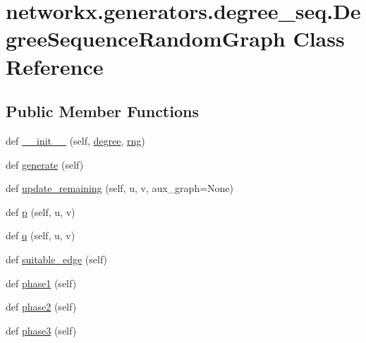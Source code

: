 \hypertarget{classnetworkx_1_1generators_1_1degree__seq_1_1DegreeSequenceRandomGraph}{}\section{networkx.\+generators.\+degree\+\_\+seq.\+Degree\+Sequence\+Random\+Graph Class Reference}
\label{classnetworkx_1_1generators_1_1degree__seq_1_1DegreeSequenceRandomGraph}
\subsection*{Public Member Functions}
\begin{DoxyCompactItemize}
\item 
def \hyperlink{classnetworkx_1_1generators_1_1degree__seq_1_1DegreeSequenceRandomGraph_abda1215d49ed03bca8b727bfaa3da4e8}{\+\_\+\+\_\+init\+\_\+\+\_\+} (self, \hyperlink{classnetworkx_1_1generators_1_1degree__seq_1_1DegreeSequenceRandomGraph_a96bccf4dd0c73fdd2569d20f7770212b}{degree}, \hyperlink{classnetworkx_1_1generators_1_1degree__seq_1_1DegreeSequenceRandomGraph_a454449cec97996eccfa28577c5055d76}{rng})
\item 
def \hyperlink{classnetworkx_1_1generators_1_1degree__seq_1_1DegreeSequenceRandomGraph_aa9e966221ec4f5b18670f6d5bac04b36}{generate} (self)
\item 
def \hyperlink{classnetworkx_1_1generators_1_1degree__seq_1_1DegreeSequenceRandomGraph_aa935b51d6d91c0256b943c147f18e32a}{update\+\_\+remaining} (self, u, v, aux\+\_\+graph=None)
\item 
def \hyperlink{classnetworkx_1_1generators_1_1degree__seq_1_1DegreeSequenceRandomGraph_aecacf66c53d371d3080cd12f33090098}{p} (self, u, v)
\item 
def \hyperlink{classnetworkx_1_1generators_1_1degree__seq_1_1DegreeSequenceRandomGraph_a1b64a2858c0e3a6ff01d9942db65ec83}{q} (self, u, v)
\item 
def \hyperlink{classnetworkx_1_1generators_1_1degree__seq_1_1DegreeSequenceRandomGraph_ab58872d19209a86d7ba8db198d1e7dbe}{suitable\+\_\+edge} (self)
\item 
def \hyperlink{classnetworkx_1_1generators_1_1degree__seq_1_1DegreeSequenceRandomGraph_a2f7fdd19d24b8367bc62414833be0412}{phase1} (self)
\item 
def \hyperlink{classnetworkx_1_1generators_1_1degree__seq_1_1DegreeSequenceRandomGraph_a6656ede132fbd41257e61d01bb670d7c}{phase2} (self)
\item 
def \hyperlink{classnetworkx_1_1generators_1_1degree__seq_1_1DegreeSequenceRandomGraph_a80b9bad860a73d989b354cfdd6ba6932}{phase3} (self)
\end{DoxyCompactItemize}
